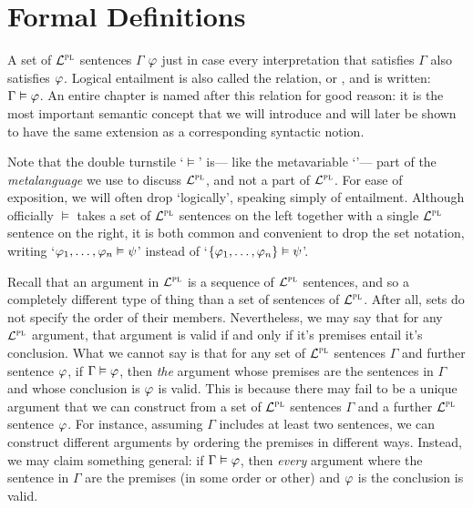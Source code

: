 


\section{Formal Definitions}
  \label{sec:Definitions}

A set of $\mathcal{L}^{\textsc{pl}}$ sentences $\Gamma$  $\varphi$ just in case every interpretation that satisfies $\Gamma$ also satisfies $\varphi$.
Logical entailment is also called the  relation, or , and is written: $\Gamma \vDash \varphi$. 
An entire chapter is named after this relation for good reason: it is the most important semantic concept that we will introduce and will later be shown to have the same extension as a corresponding syntactic notion.

Note that the double turnstile `$\models$' is--- like the metavariable `\metaA'--- part of the \emph{metalanguage} we use to discuss $\mathcal{L}^{\textsc{pl}}$, and not a part of $\mathcal{L}^{\textsc{pl}}$.
For ease of exposition, we will often drop `logically', speaking simply of entailment.
Although officially $\models$ takes a set of $\mathcal{L}^{\textsc{pl}}$ sentences on the left together with a single $\mathcal{L}^{\textsc{pl}}$ sentence on the right, it is both common and convenient to drop the set notation, writing `$\varphi_1,\ldots,\varphi_n \vDash \psi$' instead of `$\lbrace\varphi_1,\ldots,\varphi_n\rbrace \vDash \psi$'.

Recall that an argument in $\mathcal{L}^{\textsc{pl}}$ is a sequence of $\mathcal{L}^{\textsc{pl}}$ sentences, and so a completely different type of thing than a set of sentences of $\mathcal{L}^{\textsc{pl}}$.
After all, sets do not specify the order of their members.
Nevertheless, we may say that for any $\mathcal{L}^{\textsc{pl}}$ argument, that argument is valid if and only if it's premises entail it's conclusion.
What we cannot say is that for any set of $\mathcal{L}^{\textsc{pl}}$ sentences $\Gamma$ and further sentence $\varphi$, if $\Gamma \vDash \varphi$, then \textit{the} argument whose premises are the sentences in $\Gamma$ and whose conclusion is $\varphi$ is valid.
This is because there may fail to be a unique argument that we can construct from a set of $\mathcal{L}^{\textsc{pl}}$ sentences $\Gamma$ and a further $\mathcal{L}^{\textsc{pl}}$ sentence $\varphi$.
For instance, assuming $\Gamma$ includes at least two sentences, we can construct different arguments by ordering the premises in different ways.
Instead, we may claim something general: if $\Gamma \vDash \varphi$, then \textit{every} argument where the sentence in $\Gamma$ are the premises (in some order or other) and $\varphi$ is the conclusion is valid.

